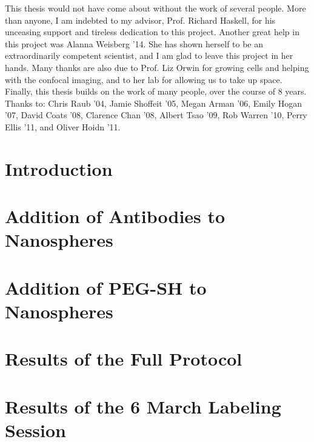 \documentclass{hmcthesis}
\begin{document}
\begin{acknowledgments}
  This thesis would not have come about without the work of several people. More than anyone, I am indebted to my advisor, Prof. Richard Haskell, for his unceasing support and tireless dedication to this project. Another great help in this project was Alanna Weisberg '14. She has shown herself to be an extraordinarily competent scientist, and I am glad to leave this project in her hands.
	Many thanks are also due to Prof. Liz Orwin for growing cells and helping with the confocal imaging, and to her lab for allowing us to take up space. 
	Finally, this thesis builds on the work of many people, over the course of 8 years. Thanks to: Chris Raub '04, Jamie Shoffeit '05, Megan Arman '06, Emily Hogan '07, David Coats '08, Clarence Chan '08, Albert Tsao '09, Rob Warren '10, Perry Ellis '11, and Oliver Hoidn '11.
\end{acknowledgments}





\tableofcontents
\listoffigures
\listoftables
\mainmatter
\chapter{Introduction}
\label{introduction}


\newpage
\chapter{Addition of Antibodies to Nanospheres}
\label{additionofantibodiestonanospheres}


\newpage
\chapter{Addition of PEG-SH to Nanospheres}
\label{additionofpeg-shtonanospheres}


\newpage
\chapter{Results of the Full Protocol}
\label{resultsofthefullprotocol}


\newpage
\chapter{Results of the 6 March Labeling Session}
\label{resultsofthe6marchlabelingsession}
\end{document}
